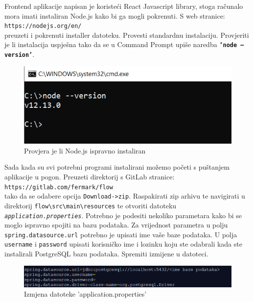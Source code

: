 			Frontend aplikacije napisan je koristeći React Javascript library, stoga računalo mora imati instaliran Node.js kako bi ga mogli pokrenuti. S web stranice: 
			\\
			\texttt{\small https://nodejs.org/en/}
			\\
			preuzeti i pokrenuti installer datoteku. Provesti standardnu instalaciju. Provjeriti je li instalacija uspješna tako da se u Command Prompt upiše naredba \texttt{\textbf{'node --version'}}.
			
			\begin{figure}[h]
				\centering
				\includegraphics[scale=0.7]{slike/pustanjeupogon/nodeversion.png}
				\caption{Provjera je li Node.js ispravno instaliran}
			\end{figure}
		
			Sada kada su svi potrebni programi instalirani možemo početi s puštanjem aplikacije u pogon. Preuzeti direktorij s GitLab stranice:
			\\
			\texttt{\small https://gitlab.com/fermark/flow}
			\\
			tako da se odabere opcija \texttt{Download->zip}. Raspakirati zip arhivu te navigirati u direktorij \texttt{\small flow\textbackslash src\textbackslash main\textbackslash resources} te otvoriti datoteku \texttt{\textit{ application.properties}}. Potrebno je podesiti nekoliko parametara kako bi se moglo ispravno spojiti na bazu podataka. Za vrijednost parametra \texttt{\small <ime baze podataka>} u polju \texttt{\small spring.datasource.url} potrebno je upisati ime vaše baze podataka. U polja \texttt{\small username} i \texttt{\small password} upisati korisničko ime i lozinku koju ste odabrali kada ste instalirali PostgreSQL bazu podataka. Spremiti izmijene u datoteci.
			
			\begin{figure}[h]
				\centering
				\includegraphics[scale=0.8]{slike/pustanjeupogon/app.png}
				\caption{Izmjena datoteke 'application.properties'}
			\end{figure}
			
